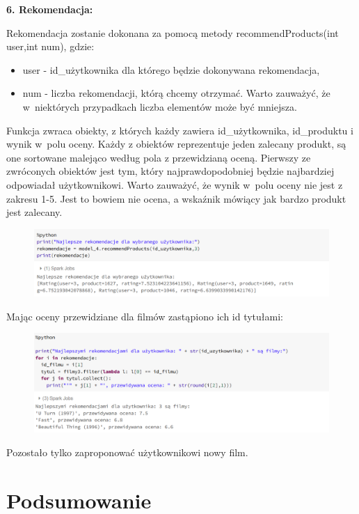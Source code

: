 \documentclass[12pt,a4paper]{report}
\begin{document}
\textbf{6. Rekomendacja:}

Rekomendacja zostanie dokonana za pomocą metody recommendProducts(int user,int num), gdzie:
\begin{itemize}
\item user - id\_użytkownika dla którego będzie dokonywana rekomendacja,
\item num - liczba rekomendacji, którą chcemy otrzymać. Warto zauważyć, że w~niektórych przypadkach liczba elementów może być mniejsza.
\end{itemize}

Funkcja zwraca obiekty, z których każdy zawiera id\_użytkownika, id\_produktu i wynik w~polu oceny. Każdy z obiektów reprezentuje jeden zalecany produkt, są one sortowane malejąco według pola z przewidzianą oceną. Pierwszy ze zwróconych obiektów jest tym, który najprawdopodobniej będzie najbardziej odpowiadał użytkownikowi. Warto zauważyć, że wynik w~polu oceny nie jest z zakresu 1-5. Jest to bowiem nie ocena, a wskaźnik mówiący jak bardzo produkt jest zalecany.

\begin{figure}[H]
\includegraphics[scale=0.5]{obrazy/ALS17.PNG} 
\end{figure}

Mając oceny przewidziane dla filmów zastąpiono ich id tytułami:

\begin{figure}[H]
\includegraphics[scale=0.5]{obrazy/ALS18.PNG} 
\end{figure}

Pozostało tylko zaproponować użytkownikowi nowy film.


\chapter{Podsumowanie}
\end{document}
